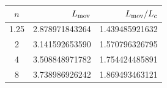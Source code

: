 \begin{tabular}{@{}crr@{}}
\toprule
$n$ & $L_{\rm mov}$ & $L_{\rm mov}/L_c$ \\
\midrule
1.25 & 2.878971843264 & 1.439485921632 \\
2 & 3.141592653590 & 1.570796326795 \\
4 & 3.508848971782 & 1.754424485891 \\
8 & 3.738986926242 & 1.869493463121 \\
\bottomrule
\end{tabular}
